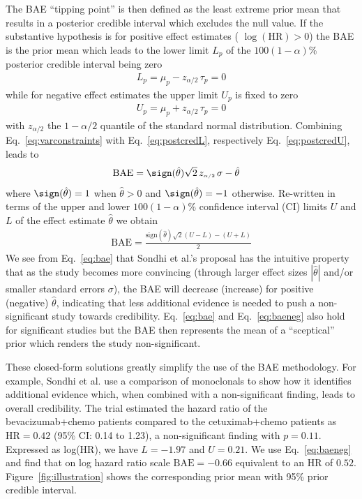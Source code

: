The BAE ``tipping point'' is then defined as the least extreme prior mean that
results in a posterior credible interval which excludes the null value. If the
substantive hypothesis is for positive effect estimates (\eg
$\log(\mbox{HR}) > 0$) the BAE is the prior mean which leads to the lower limit
$L_{p}$ of the $100(1 - \alpha)$\% posterior credible interval being zero
\begin{align}
  L_{p} = \mu_{p} - z_{\scriptscriptstyle \alpha/2} \, \tau_{p} = 0
  \label{eq:postcredL}
\end{align}
while for negative effect estimates the upper limit $U_{p}$ is fixed to zero
\begin{align}
  U_{p} = \mu_{p} + z_{\scriptscriptstyle \alpha/2} \, \tau_{p} = 0
  \label{eq:postcredU}
\end{align}
with $z_{\scriptscriptstyle \alpha/2}$ the $1 - \alpha/2$ quantile of the
standard normal distribution. Combining Eq.~\eqref{eq:varconstraints} with
Eq.~\eqref{eq:postcredL}, respectively Eq.~\eqref{eq:postcredU}, leads to
\begin{align}
  \text{BAE}
  & =  \sign(\hat{\theta}) \sqrt{2} \, z_{\scriptscriptstyle \alpha/2} \, \sigma - \hat{\theta}
    \label{eq:bae}
\end{align}
where $\sign(\hat{\theta}) = 1$ when $\hat{\theta} > 0$ and
$\sign(\hat{\theta}) = -1$ otherwise. Re-written in terms of the upper and lower
$100(1 - \alpha)$\% confidence interval (CI) limits $U$ and $L$ of the effect
estimate $\hat{\theta}$ we obtain
\begin{align}
  \text{BAE} = \frac{\text{sign}(\hat{\theta}) \sqrt{2} (U - L) - (U + L)}{2}
  \label{eq:baeneg}
\end{align}
We see from Eq.~\eqref{eq:bae} that Sondhi et al.'s proposal has the intuitive
property that as the study becomes more convincing (through larger effect sizes
$|\hat{\theta}|$ and/or smaller standard errors $\sigma$), the BAE will decrease
(increase) for positive (negative) $\hat{\theta}$, indicating that less
additional evidence is needed to push a non-significant study towards
credibility. Eq.~\eqref{eq:bae} and Eq.~\eqref{eq:baeneg} also hold for
significant studies but the BAE then represents the mean of a ``sceptical''
prior which renders the study non-significant.





These closed-form solutions greatly simplify the use of the BAE methodology. For
example, Sondhi et al. use a comparison of monoclonals to show how it identifies
additional evidence which, when combined with a non-significant finding, leads
to overall credibility. The trial estimated the hazard ratio of the
bevacizumab+chemo patients compared to the cetuximab+chemo patients as
$\mbox{HR} = 0.42$ (95\% CI: 0.14 to 1.23), a non-significant finding with $p = 0.11$. Expressed as log(HR), we
have $L = -1.97$ and
$U = 0.21$. We use Eq.~\eqref{eq:baeneg} and find that
on log hazard ratio scale $\mbox{BAE} = -0.66$ equivalent to an
HR of $0.52$. Figure~\ref{fig:illustration} shows the
corresponding prior mean with 95\% prior
credible interval.

